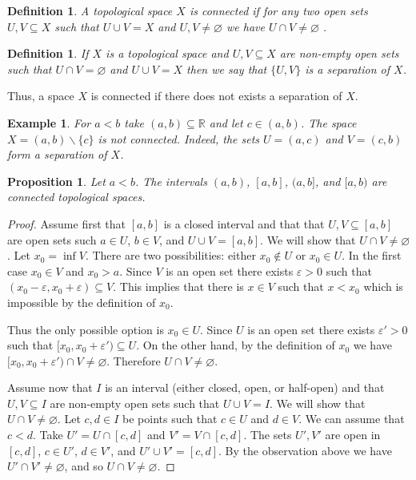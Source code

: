 \documentclass[11pt, letterpaper, oneside]{report}
\theoremstyle{pplain}
\newtheorem{proposition}[theorem]{Proposition}
\newtheorem{ITERMVALUE THM}[theorem]{Intermediate Value Theorem}
\newtheorem{HEINEBOREL THM}[theorem]{Heine-Borel Theorem}
\newtheorem{UMETR THM}[theorem]{Urysohn Metrization Theorem}
\newtheorem{UMETR2 THM}[theorem]{Urysohn Metrization Theorem (v.2)}
\theoremstyle{ddefinition}
\newtheorem{definition}[theorem]{Definition}
\newtheorem{example}[theorem]{Example}
\theoremstyle{nnn}
\newtheorem{TDA NN}[theorem]{Topological Data Analysis. }
\theoremstyle{eexercise}
\newcommand{\R}{{\mathbb R}}
\newcommand{\ssmin}{\smallsetminus}
\begin{document}
\begin{definition}
A topological space $X$ is \emph{connected} if for any  two open sets $U, V\subseteq X$
such that $U\cup V = X$ and $U, V \neq \varnothing$  we have $U\cap V \neq  \varnothing $ . 
\end{definition}

\begin{definition}
If $X$ is a topological space and $U, V\subseteq X$ are non-empty open sets such that $U\cap V = \varnothing$
and $U\cup V = X$ then we  say that $\{U, V\}$ is a \emph{separation} of $X$.  
\end{definition}

Thus, a space $X$ is connected if there does not exists a separation of $X$.   

\begin{example}
\label{INTERV WITHOUT POINT NOT CONN EX}
For $a< b$ take  $(a, b)\subseteq \R$ and let $c\in (a, b)$. 
The space $X = (a, b)\ssmin \{c\}$ is not connected. 
Indeed, the sets $U= (a, c)$ and $V= (c, b)$ form a separation of $X$. 
\end{example}

\begin{proposition}
\label{INTERV IS CONNECT PROP}
Let $a<b$. The intervals $(a, b)$, $[a, b]$, $(a, b]$, and $[a, b)$ are connected topological 
spaces. 
\end{proposition}

\begin{proof}
Assume first that $[a, b]$ is a closed interval and that that $U, V\subseteq [a, b]$ are open sets 
such $a\in U$, $b\in V$, and $U\cup V = [a, b]$. We will show that $U\cap V \neq \varnothing$. 
Let $x_{0} = \inf V$. There are two possibilities:  either $x_{0}\not\in U$ or $x_{0}\in U$. 
In the first case  $x_{0}\in V$ and $x_{0} > a$. Since $V$ is an open set there exists $\varepsilon > 0$ 
such that $(x_{0}-\varepsilon, x_{0}+ \varepsilon)\subseteq V$. This implies that there is  $x\in V$ such that 
$x < x_{0}$ which is impossible by the definition of $x_{0}$. 

Thus the only possible option is  $x_{0}\in U$.  Since  $U$ is an open set there exists $\varepsilon' > 0$
such that  $[x_{0}, x_{0}+ \varepsilon')\subseteq U$. On the other hand, by the definition 
of $x_{0}$ we have $[x_{0}, x_{0}+ \varepsilon') \cap V \neq \varnothing$. Therefore $U\cap V \neq \varnothing$.

Assume now that $I$ is an interval (either closed, open, or half-open) and that $U, V\subseteq I$ are non-empty
open sets such that $U\cup V = I$. We will show that $U\cap V \neq \varnothing$. Let 
$c, d\in I$ be points such that $c\in U$ and $d\in V$. We can assume that $c < d$. Take
$U' = U\cap [c, d]$ and $V' = V \cap [c, d]$. The sets $U', V'$ are open in $[c, d]$, $c\in U'$, $d\in V'$, and
$U' \cup V' = [c, d]$. By the observation above we have $U'\cap V' \neq \varnothing$, and so 
$U\cap V \neq \varnothing$.  




\end{proof}
\end{document}
